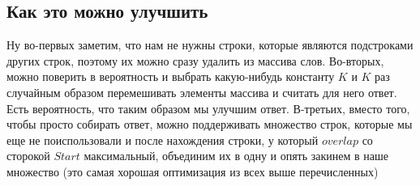 \documentclass{article}
\begin{document}
\subsection{Как это можно улучшить}
Ну во-первых заметим, что нам не нужны строки, которые являются подстроками других строк, поэтому их можно сразу удалить из массива слов.\newline
Во-вторых, можно поверить в вероятность и выбрать какую-нибудь константу $K$ и $K$ раз случайным образом перемешивать элементы массива и считать для него ответ. Есть вероятность, что таким образом мы улучшим ответ.
В-третьих, вместо того, чтобы просто собирать ответ, можно поддерживать множество строк, которые мы еще не поиспользовали и после нахождения строки, у который $overlap$ со сторокой $Start$ максимальный, объединим их в одну и опять закинем в наше множество (это самая хорошая оптимизация из всех выше перечисленных)
\end{document}
